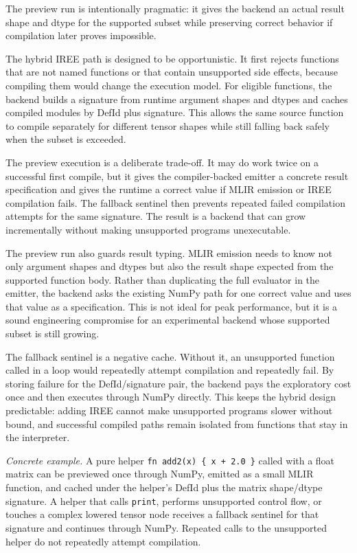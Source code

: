 The preview run is intentionally pragmatic: it gives the backend an actual
result shape and dtype for the supported subset while preserving correct
behavior if compilation later proves impossible.

The hybrid IREE path is designed to be opportunistic. It first rejects
functions that are not named \einlang{} functions or that contain unsupported
side effects, because compiling them would change the execution model. For
eligible functions, the backend builds a signature from runtime argument
shapes and dtypes and caches compiled modules by DefId plus signature. This
allows the same source function to compile separately for different tensor
shapes while still falling back safely when the subset is exceeded.

The preview execution is a deliberate trade-off. It may do work twice on a
successful first compile, but it gives the compiler-backed emitter a concrete
result specification and gives the runtime a correct value if MLIR emission or
IREE compilation fails. The fallback sentinel then prevents repeated failed
compilation attempts for the same signature. The result is a backend that can
grow incrementally without making unsupported programs unexecutable.

The preview run also guards result typing. MLIR emission needs to know not only
argument shapes and dtypes but also the result shape expected from the supported
function body. Rather than duplicating the full evaluator in the emitter, the
backend asks the existing NumPy path for one correct value and uses that value
as a specification. This is not ideal for peak performance, but it is a sound
engineering compromise for an experimental backend whose supported subset is
still growing.

The fallback sentinel is a negative cache. Without it, an unsupported function
called in a loop would repeatedly attempt compilation and repeatedly fail. By
storing failure for the DefId/signature pair, the backend pays the exploratory
cost once and then executes through NumPy directly. This keeps the hybrid design
predictable: adding IREE cannot make unsupported programs slower without bound,
and successful compiled paths remain isolated from functions that stay in the
interpreter.

\textit{Concrete example.} A pure helper \texttt{fn add2(x) \{ x + 2.0 \}}
called with a float matrix can be previewed once through NumPy, emitted as a
small MLIR function, and cached under the helper's DefId plus the matrix
shape/dtype signature. A helper that calls \texttt{print}, performs unsupported
control flow, or touches a complex lowered tensor node receives a fallback
sentinel for that signature and continues through NumPy. Repeated calls to the
unsupported helper do not repeatedly attempt compilation.

